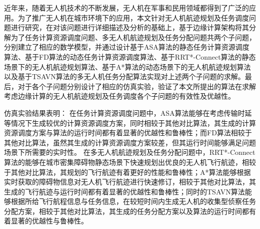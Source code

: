 \begin{abstractzh}

近年来，随着无人机技术的不断发展，无人机在军事和民用领域都得到了广泛的应用。为了推广无人机在城市环境下的应用，本文针对无人机航迹规划及任务调度问题进行研究，在对该问题进行详细描述及分析的基础上，基于边缘计算架构将其分解为了任务计算资源调度问题、多无人机航迹规划及任务分配问题共两个子问题，分别建立了相应的数学模型，并通过设计基于ASA算法的静态任务计算资源调度算法、基于FD算法的动态任务计算资源调度算法、基于RRT*-Connect算法的静态场景下的无人机航迹规划算法、基于A*算法的动态场景下的无人机航迹规划算法以及基于TSAVN算法的多无人机任务分配算法实现对上述两个子问题的求解。最后，对于各个子问题分别设计了相应的仿真实验，验证了本文所提出的算法在求解考虑边缘计算的无人机航迹规划及任务调度各个子问题的有效性及优越性。

仿真实验结果表明：
在任务计算资源调度问题中，ASA算法能够在考虑传输时延等情况下生成较优的计算资源调度方案，同时相较于其他对比算法，其生成的计算资源调度方案与算法的运行时间都有着显著的优越性和鲁棒性；而FD算法相较于其他对比算法，虽然其生成的计算资源调度方案较差，但其运行时间能够满足问题场景下所需要的实时性。
在多无人机航迹规划及任务分配问题中，RRT*-Connect算法的能够在城市密集障碍物静态场景下快速规划出优良的无人机飞行航迹，相较于其他对比算法，其规划的飞行航迹有着更好的性能和鲁棒性；A*算法能够根据实时获取的障碍物信息对无人机飞行航迹进行快速修订，相较于其他对比算法，其生成的飞行航迹与运行时间都有着显著的优越性和鲁棒性；同时的TSAVN算法能够根据所给飞行航程信息与任务信息，在较短时间内生成无人机的收集型侦察任务分配方案，相较于其他对比算法，其生成的任务分配方案以及算法的运行时间都有着显著的优越性与鲁棒性。

\end{abstractzh}
